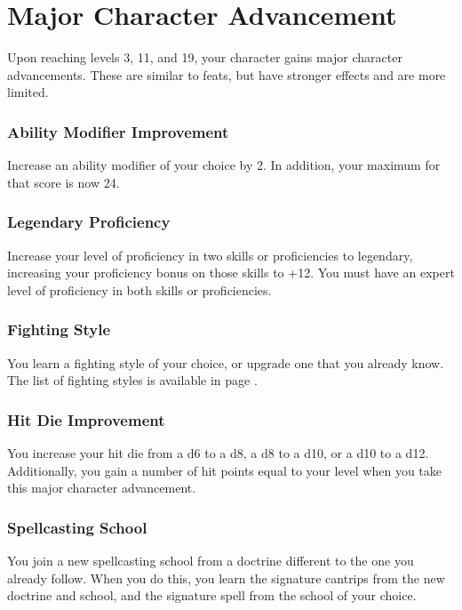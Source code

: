 \section{Major Character Advancement} \label{sec::majorcharacteradvancement}
Upon reaching levels 3, 11, and 19, your character gains major character advancements.
These are similar to feats, but have stronger effects and are more limited.

\subsubsection{Ability Modifier Improvement} \label{mca::abilitymodifierimprovement}
    Increase an ability modifier of your choice by 2.
    In addition, your maximum for that score is now 24.

\subsubsection{Legendary Proficiency} \label{mca::legendaryproficiency}
    Increase your level of proficiency in two skills or proficiencies to legendary, increasing your proficiency bonus on those skills to +12.
    You must have an expert level of proficiency in both skills or proficiencies.

\subsubsection{Fighting Style} \label{mca::fightingstyle}
    You learn a fighting style of your choice, or upgrade one that you already know.
    The list of fighting styles is available in page \pageref{ssec::fightingstyles}.

\subsubsection{Hit Die Improvement} \label{mca::hitdieimprovement}
    You increase your hit die from a d6 to a d8, a d8 to a d10, or a d10 to a d12.
    Additionally, you gain a number of hit points equal to your level when you take this major character advancement.

\subsubsection{Spellcasting School} \label{mca::spellcastingschool}
    You join a new spellcasting school from a doctrine different to the one you already follow.
    When you do this, you learn the signature cantrips from the new doctrine and school, and the signature spell from the school of your choice.

